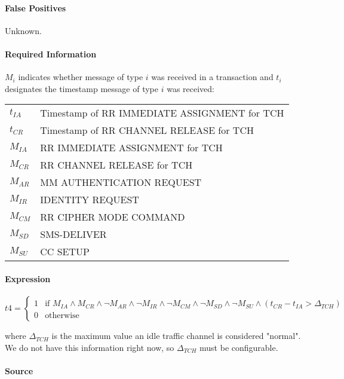 \documentclass[a4paper,11pt,notitlepage,bigheadings,oneside]{scrartcl}
\begin{document}
\paragraph{False Positives}

Unknown.

\paragraph{Required Information}

$M_i$ indicates whether message of type $i$ was received in a transaction and
$t_i$ designates the timestamp message of type $i$ was received:

\begin{tabular}{ll}
\hline
$t_{IA}$ & Timestamp of RR IMMEDIATE ASSIGNMENT for TCH \\
$t_{CR}$ & Timestamp of RR CHANNEL RELEASE for TCH \\
$M_{IA}$ & RR IMMEDIATE ASSIGNMENT for TCH \\
$M_{CR}$ & RR CHANNEL RELEASE for TCH \\
$M_{AR}$ & MM AUTHENTICATION REQUEST \\
$M_{IR}$ & IDENTITY REQUEST \\
$M_{CM}$ & RR CIPHER MODE COMMAND \\
$M_{SD}$ & SMS-DELIVER \\
$M_{SU}$ & CC SETUP \\
\hline
\end{tabular}


\paragraph{Expression}

$t4 =
\begin{cases}
	1 & \text{if } M_{IA} \wedge M_{CR} \wedge \neg M_{AR} \wedge \neg M_{IR} \wedge \neg M_{CM} \wedge \neg M_{SD} \wedge \neg M_{SU} \wedge (t_{CR} - t_{IA} > \Delta_{TCH}) \\
	0 & \text{otherwise}
\end{cases}$

where $\Delta_{TCH}$ is the maximum value an idle traffic channel is considered
"normal". We do not have this information right now, so $\Delta_{TCH}$ must be
configurable.

\paragraph{Source}
\end{document}
